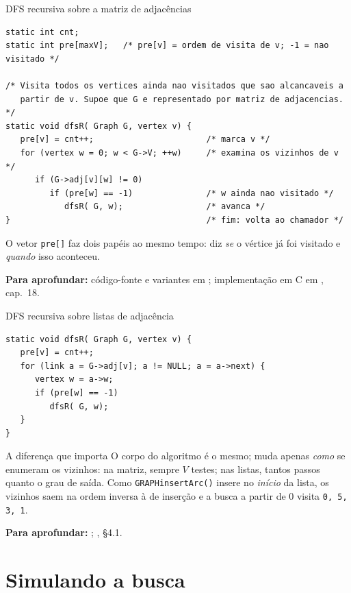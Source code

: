 \documentclass[aspectratio=169]{beamer}
\newcommand{\fonte}[1]{%
  \vfill
  {\tiny\color{gray!55!black}\textbf{Para aprofundar:} #1\par}%
}
\begin{document}
\begin{frame}[fragile]{DFS recursiva sobre a matriz de adjacências}
\begin{lstlisting}
static int cnt;
static int pre[maxV];   /* pre[v] = ordem de visita de v; -1 = nao visitado */

/* Visita todos os vertices ainda nao visitados que sao alcancaveis a
   partir de v. Supoe que G e representado por matriz de adjacencias. */
static void dfsR( Graph G, vertex v) {
   pre[v] = cnt++;                       /* marca v */
   for (vertex w = 0; w < G->V; ++w)     /* examina os vizinhos de v */
      if (G->adj[v][w] != 0)
         if (pre[w] == -1)               /* w ainda nao visitado */
            dfsR( G, w);                 /* avanca */
}                                        /* fim: volta ao chamador */
\end{lstlisting}
  {\scriptsize O vetor \texttt{pre[]} faz dois papéis ao mesmo tempo: diz
  \emph{se} o vértice já foi visitado e \emph{quando} isso aconteceu.}
  \fonte{código-fonte e variantes em \cite{feofiloff2020algoritmos};
  implementação em C em \cite{sedgewick2002algorithms}, cap.~18.}
\end{frame}

\begin{frame}[fragile]{DFS recursiva sobre listas de adjacência}
\begin{lstlisting}
static void dfsR( Graph G, vertex v) {
   pre[v] = cnt++;
   for (link a = G->adj[v]; a != NULL; a = a->next) {
      vertex w = a->w;
      if (pre[w] == -1)
         dfsR( G, w);
   }
}
\end{lstlisting}
  \begin{exampleblock}{A diferença que importa}
    {\scriptsize O corpo do algoritmo é o mesmo; muda apenas \emph{como} se enumeram
    os vizinhos: na matriz, sempre $V$ testes; nas listas, tantos passos quanto o
    grau de saída. Como \texttt{GRAPHinsertArc()} insere no \emph{início} da lista,
    os vizinhos saem na ordem inversa à de inserção e a busca a partir de 0 visita
    \texttt{0, 5, 3, 1}.}
  \end{exampleblock}
  \fonte{\cite{feofiloff2020algoritmos}; \cite{sedgewick2011algorithms}, §4.1.}
\end{frame}

\section{Simulando a busca}
\end{document}
